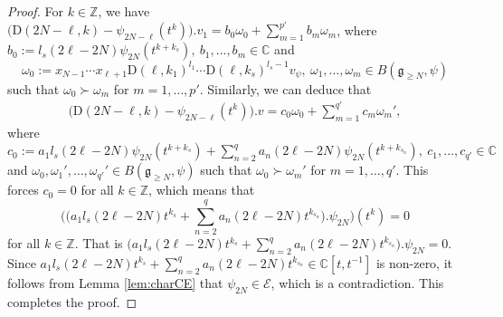\documentclass[12pt, a4paper]{amsart}
\newcommand{\fg}{\mathfrak g}
\newcommand{\C}{\mathbb{C}}
\newcommand{\Z}{\mathbb Z}
\newcommand{\rD}{\mathrm{D}}
\theoremstyle{Theorem}
\theoremstyle{Theorem}
\numberwithin{equation}{section}
\begin{document}
\begin{proof}
For $k\in\Z$, we have
$\big(\rD(2N-\ell,k)-\psi_{2N-\ell}(t^{k})\big).v_{1}=b_{0}\omega_{0}+\sum_{m=1}^{p'}b_{m}\omega_{m}$,
where $b_{0}:=l_{s}(2\ell-2N)\psi_{2N}(t^{k+k_{s}}),\ b_{1},\dots,b_{m}\in\C$ and
\[\omega_{0}:=x_{N-1}\cdots x_{\ell+1}\rD(\ell,k_{1})^{l_{1}}\cdots
\rD(\ell,k_{s})^{l_{s}-1}v_{\psi},\ \omega_{1},\dots,\omega_{m}\in B(\fg_{\geq N},\psi)\]
such that $\omega_{0}\succ\omega_{m}$ for $m=1,\dots,p'$. Similarly, we can deduce that
\begin{align}\label{Imp-1}\big(\rD(2N-\ell,k)-\psi_{2N-\ell}(t^{k})\big).v
=c_{0}\omega_{0}+\sum_{m=1}^{q'}c_{m}\omega_{m}',\end{align}
where $c_{0}:=a_{1}l_{s}(2\ell-2N)\psi_{2N}(t^{k+k_{s}})+
\sum_{n=2}^{q}a_{n}(2\ell-2N)\psi_{2N}(t^{k+k_{s_{n}}}),\ c_{1},\dots,c_{q'}\in\C$
and $\omega_{0},\omega_{1}',\dots,\omega_{q'}'\in B(\fg_{\geq N},\psi)$ such that $\omega_{0}\succ\omega_{m}'$
for $m=1,\dots,q'$. This forces $c_{0}=0$ for all $k\in\Z$, which means that
\[\Big(\big(a_{1}l_{s}(2\ell-2N)t^{k_{s}}+\sum_{n=2}^{q}a_{n}(2\ell-2N)t^{k_{s_{n}}}\big).\psi_{2N}\Big)(t^{k})=0\]
for all $k\in\Z$. That is $\big(a_{1}l_{s}(2\ell-2N)t^{k_{s}}+\sum_{n=2}^{q}a_{n}(2\ell-2N)t^{k_{s_{n}}}\big).\psi_{2N}=0$.
Since $a_{1}l_{s}(2\ell-2N)t^{k_{s}}+\sum_{n=2}^{q}a_{n}(2\ell-2N)t^{k_{s_{n}}}\in\C[t,t^{-1}]$ is non-zero,
it follows from Lemma \ref{lem:charCE} that $\psi_{2N}\in\mathcal{E}$, which is a contradiction.
This completes the proof.
\end{proof}
\end{document}
